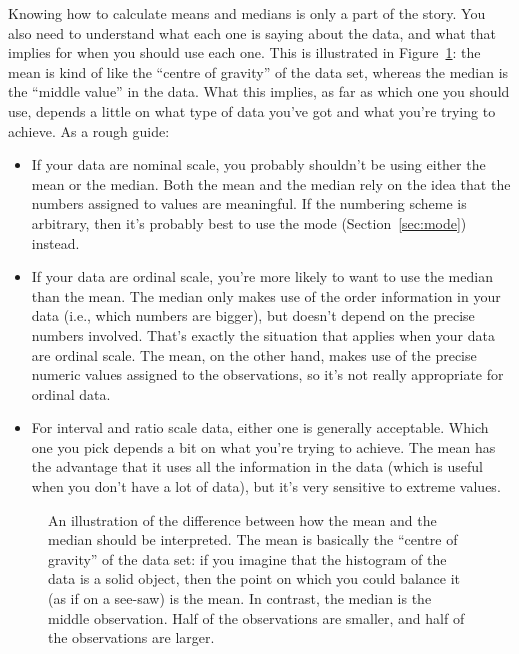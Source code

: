 
Knowing how to calculate means and medians is only a part of the story. You also need to understand what each one is saying about the data, and what that implies for when you should use each one. This is illustrated in Figure~\ref{fig:meanmedian}: the mean is kind of like the ``centre of gravity'' of the data set, whereas the median is the ``middle value'' in the data. What this implies, as far as which one you should use, depends a little on what type of data you've got and what you're trying to achieve. As a rough guide:
\begin{itemize} 
\item If your data are nominal scale, you probably shouldn't be using either the mean or the median. Both the mean and the median rely on the idea that the numbers assigned to values are meaningful. If the numbering scheme is arbitrary, then it's probably best to use the mode (Section~\ref{sec:mode}) instead. 
\item If your data are ordinal scale, you're more likely to want to use the median than the mean. The median only makes use of the order information in your data (i.e., which numbers are bigger), but doesn't depend on the precise numbers involved. That's exactly the situation that applies when your data are ordinal scale. The mean, on the other hand, makes use of the precise numeric values assigned to the observations, so it's not really appropriate for ordinal data.
\item For interval and ratio scale data, either one is generally acceptable. Which one you pick depends a bit on what you're trying to achieve. The mean has the advantage that it uses all the information in the data (which is useful when you don't have a lot of data), but it's very sensitive to extreme values.  
\end{itemize}

\vspace*{1cm}
\begin{figure}[ht]
\begin{center}
\caption{An illustration of the difference between how the mean and the median should be interpreted. The mean is basically the ``centre of gravity'' of the data set: if you imagine that the histogram of the data is a solid object, then the point on which you could balance it (as if on a see-saw) is the mean. In contrast, the median is the middle observation. Half of the observations are smaller, and half of the observations are larger.}
\HR
\label{fig:meanmedian}
\end{center}
\end{figure}

